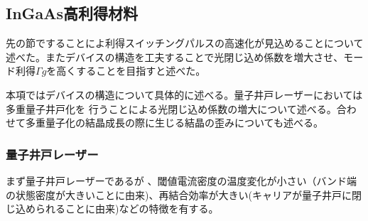 \clearpage
\subsection{InGaAs高利得材料}
先の節ですることによ利得スイッチングパルスの高速化が見込めることについて述べた。またデバイスの構造を工夫することで光閉じ込め係数を増大させ、モード利得$\Gamma g$を高くすることを目指すと述べた。

本項ではデバイスの構造について具体的に述べる。量子井戸レーザーにおいては多重量子井戸化を
行うことによる光閉じ込め係数の増大について述べる。合わせて多重量子化の結晶成長の際に生じる結晶の歪みについても述べる。
\subsubsection{量子井戸レーザー}
まず量子井戸レーザーであるが
、閾値電流密度の温度変化が小さい（バンド端の状態密度が大きいことに由来)、再結合効率が大きい(キャリアが量子井戸に閉じ込められることに由来)などの特徴を有する。


